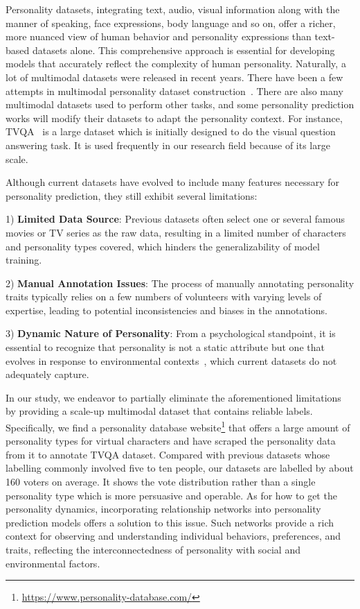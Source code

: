 Personality datasets, integrating text, audio, visual information along with the manner of speaking, face expressions, body language and so on, offer a richer, more nuanced view of human behavior and personality expressions than text-based datasets alone. This comprehensive approach is essential for developing models that accurately reflect the complexity of human personality. Naturally, a lot of multimodal datasets were released in recent years. There have been a few attempts in multimodal personality dataset construction~\citep{9407599,Junior_2021,Jiang_2020,chen2022cped}. There are also many multimodal datasets used to perform other tasks, and some personality prediction works will modify their datasets to adapt the personality context. For instance, TVQA~\citep{Lei_2018} is a large dataset which is initially designed to do the visual question answering task. It is used frequently in our research field because of its large scale.

Although current datasets have evolved to include many features necessary for personality prediction, they still exhibit several limitations: 

1) \textbf{Limited Data Source}: Previous datasets often select one or several famous movies or TV series as the raw data, resulting in a limited number of characters and personality types covered, which hinders the generalizability of model training.

2) \textbf{Manual Annotation Issues}: The process of manually annotating personality traits typically relies on a few numbers of volunteers with varying levels of expertise, leading to potential inconsistencies and biases in the annotations.

3) \textbf{Dynamic Nature of Personality}: From a psychological standpoint, it is essential to recognize that personality is not a static attribute but one that evolves in response to environmental contexts~\citep{9407599}, which current datasets do not adequately capture.


In our study, we endeavor to partially eliminate the aforementioned limitations by providing a scale-up multimodal dataset that contains reliable labels. Specifically, we find a personality database website\footnote[1]{\href{https://www.personality-database.com/}{https://www.personality-database.com/}} that offers a large amount of personality types for virtual characters and \citet{zhu2023personalityaware} have scraped the personality data from it to annotate TVQA dataset. Compared with previous datasets whose labelling commonly involved five to ten people, our datasets are labelled by about 160 voters on average. It shows the vote distribution rather than a single personality type which is more persuasive and operable. As for how to get the personality dynamics, incorporating relationship networks into personality prediction models offers a solution to this issue. Such networks provide a rich context for observing and understanding individual behaviors, preferences, and traits, reflecting the interconnectedness of personality with social and environmental factors.

